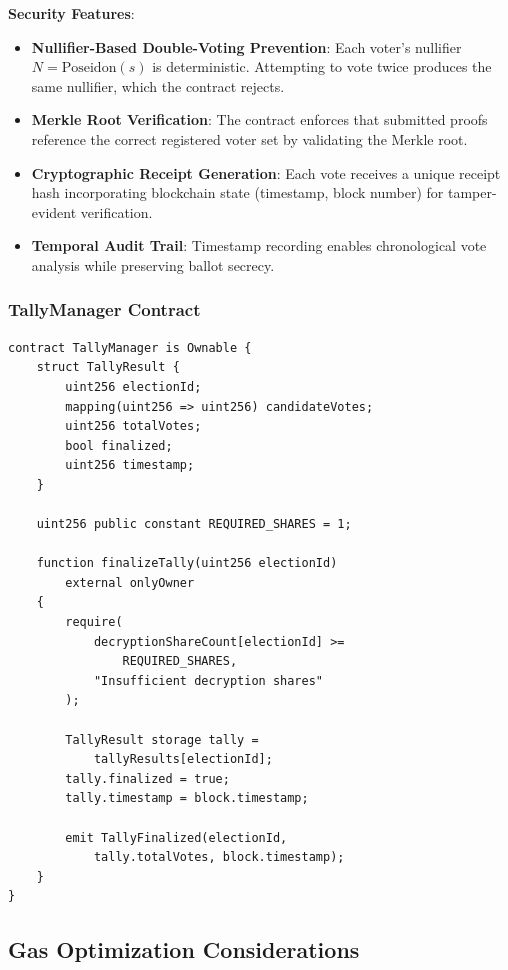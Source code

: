 \documentclass[conference]{IEEEtran}
\begin{document}
\textbf{Security Features}:
\begin{itemize}
    \item \textbf{Nullifier-Based Double-Voting Prevention}: Each voter's nullifier $N = \text{Poseidon}(s)$ is deterministic. Attempting to vote twice produces the same nullifier, which the contract rejects.
    \item \textbf{Merkle Root Verification}: The contract enforces that submitted proofs reference the correct registered voter set by validating the Merkle root.
    \item \textbf{Cryptographic Receipt Generation}: Each vote receives a unique receipt hash incorporating blockchain state (timestamp, block number) for tamper-evident verification.
    \item \textbf{Temporal Audit Trail}: Timestamp recording enables chronological vote analysis while preserving ballot secrecy.
\end{itemize}

\subsubsection{TallyManager Contract}

\begin{lstlisting}[style=solidity, caption={TallyManager Threshold Decryption}]
contract TallyManager is Ownable {
    struct TallyResult {
        uint256 electionId;
        mapping(uint256 => uint256) candidateVotes;
        uint256 totalVotes;
        bool finalized;
        uint256 timestamp;
    }
    
    uint256 public constant REQUIRED_SHARES = 1;
    
    function finalizeTally(uint256 electionId) 
        external onlyOwner 
    {
        require(
            decryptionShareCount[electionId] >= 
                REQUIRED_SHARES,
            "Insufficient decryption shares"
        );
        
        TallyResult storage tally = 
            tallyResults[electionId];
        tally.finalized = true;
        tally.timestamp = block.timestamp;
        
        emit TallyFinalized(electionId, 
            tally.totalVotes, block.timestamp);
    }
}
\end{lstlisting}

\subsection{Gas Optimization Considerations}
\end{document}
